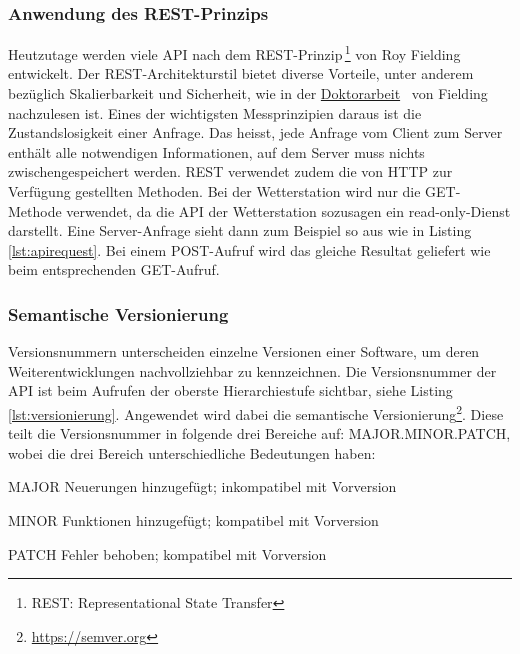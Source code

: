 \subsubsection{Anwendung des REST-Prinzips}
Heutzutage werden viele API nach dem REST-Prinzip\,\footnote{REST: Representational State Transfer} von Roy Fielding entwickelt. Der REST-Architekturstil bietet diverse Vorteile, unter anderem bezüglich Skalierbarkeit und Sicherheit, wie in der \href{https://www.ics.uci.edu/~fielding/pubs/dissertation/top.htm}{Doktorarbeit}~\cite{Fielding:2000:ASD:932295} von Fielding nachzulesen ist. Eines der wichtigsten Messprinzipien daraus ist die Zustandslosigkeit einer Anfrage. Das heisst, jede Anfrage vom Client zum Server enthält alle notwendigen Informationen, auf dem Server muss nichts zwischengespeichert werden. REST verwendet zudem die von HTTP zur Verfügung gestellten Methoden\cite{LornaJaneMitchell2013oreilly}. Bei der Wetterstation wird nur die GET-Methode verwendet, da die API der Wetterstation sozusagen ein read-only-Dienst darstellt. Eine Server-Anfrage sieht dann zum Beispiel so aus wie in Listing\,\ref{lst:apirequest}. Bei einem POST-Aufruf wird das gleiche Resultat geliefert wie beim entsprechenden GET-Aufruf.




\subsubsection{Semantische Versionierung}
Versionsnummern unterscheiden einzelne Versionen einer Software, um deren Weiterentwicklungen nachvollziehbar zu kennzeichnen. Die Versionsnummer der API ist beim Aufrufen der oberste Hierarchiestufe sichtbar, siehe Listing\,\ref{lst:versionierung}. Angewendet wird dabei die semantische Versionierung\footnote{\url{https://semver.org}}. Diese teilt die Versionsnummer in folgende drei Bereiche auf: MAJOR.MINOR.PATCH, wobei die drei Bereich unterschiedliche Bedeutungen haben:

\begin{description*}
  \item[MAJOR] Neuerungen hinzugefügt; inkompatibel mit Vorversion
  \item[MINOR] Funktionen hinzugefügt; kompatibel mit Vorversion
  \item[PATCH] Fehler behoben; kompatibel mit Vorversion
\end{description*}

